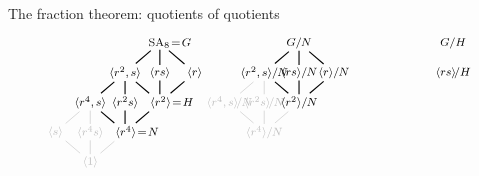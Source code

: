 \documentclass[8pt, handout]{beamer}
\begin{document}
\begin{frame}{The fraction theorem: quotients of quotients}
  \[
  \begin{tikzpicture}[node distance=1cm,shorten >= -2pt, shorten <= -2pt,scale=.5]
    \tikzstyle{every node}=[font=\footnotesize]
    \begin{scope}[shift={(0,0)}]
      \node (G) at (3.5,6) {$\hspace{5mm}\SA_8\!=\!G$};
      \node(rs) at (3.5,4.5) {$\<rs\>$};
      \node(r2-s) at (1.75,4.5) {$\<r^2,s\>$};
      \node(r) at (5.25,4.5) {$\<r\>$};
      \node(r4-s) at (0,3) {$\<r^4,s\>$};
      \node(r2s) at (1.75,3) {$\<r^2s\>$};
      \node(r2) at (3.5,3) {$\hspace{6mm}\<r^2\>\!=\!H$};
      \node(s) at (-1.75,1.5) {\color{faded}$\<s\>$};
      \node(r4s) at (0,1.5) {\color{faded}$\<r^4s\>$};
      \node(r4) at (1.75,1.5) {$\hspace{6mm}\<r^4\>\!=\!N$};
      \node(1) at (0,0) {\color{faded}$\<1\>$};
      \draw[faded] (1) -- (s);
      \draw[faded] (1) -- (r4s);
      \draw[faded] (1) -- (r4);
      \draw[faded] (s) -- (r4-s);
      \draw[faded] (r4s) -- (r4-s);
      \draw [thick] (r4) -- (r4-s); 
      \draw [thick] (r4) -- (r2s);
      \draw [thick] (r4) -- (r2);
      \draw [thick] (r4-s) -- (r2-s);
      \draw [thick] (r2s) -- (r2-s);
      \draw [thick] (r2) -- (r2-s);
      \draw [thick] (r2) -- (r);
      \draw [thick] (r2) -- (rs);
      \draw [thick] (r2-s) -- (G);
      \draw [thick] (r) -- (G);
      \draw [thick] (rs) -- (G);
    \end{scope}
    \begin{scope}[shift={(7,0)}]
      \node(G) at (3.5,6) {$G/N$};
      \node(rs) at (3.5,4.5) {$\<rs\>/N$};
      \node(r2-s) at (1.75,4.5) {$\<r^2,s\>/N$};
      \node(r) at (5.25,4.5) {$\<r\>/N$};
      \node(r4-s) at (0,3) {\color{faded}$\<r^4,s\>\!/N$};
      \node(r2s) at (1.75,3) {\color{faded}$\<r^2s\>\!/N$};
      \node(r2) at (3.5,3) {$\<r^2\>/N$};
      \node(r4) at (1.75,1.5) {\color{faded}$\<r^4\>/N$};
      \draw[faded] (r4) -- (r4-s);
      \draw[faded] (r4) -- (r2s);
      \draw[faded] (r4) -- (r2);
      \draw[faded] (r4-s) -- (r2-s);
      \draw[faded] (r2s) -- (r2-s);
      \draw [thick] (r2) -- (r2-s);
      \draw [thick] (r2) -- (r);
      \draw [thick] (r2) -- (rs);
      \draw [thick] (r2-s) -- (G);
      \draw [thick] (r) -- (G);
      \draw [thick] (rs) -- (G);
    \end{scope}
    \begin{scope}[shift={(14.75,0)}]
      \node(G) at (3.5,6) {$G/H$};
      \node(rs) at (3.5,4.5) {$\<rs\>\!/H$};

\end{scope}
\end{tikzpicture}\]
\end{frame}
\end{document}
